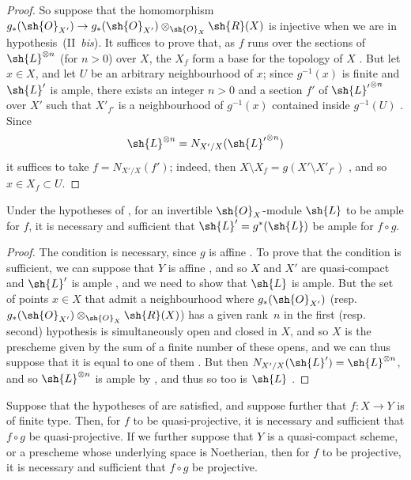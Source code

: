 \begin{proof}
So suppose that the homomorphism $g_*(\sh{O}_{X'})\to g_*(\sh{O}_{X'})\otimes_{\sh{O}_X}\sh{R}(X)$ is injective when we are in hypothesis~(II~\emph{bis}).
It suffices to prove that, as $f$ runs over the sections of $\sh{L}^{\otimes n}$ (for $n>0$) over $X$, the $X_f$ form a base for the topology of $X$ .
But let $x\in X$, and let $U$ be an arbitrary neighbourhood of $x$;
since $g^{-1}(x)$ is finite  and $\sh{L}'$ is ample, there exists an integer $n>0$ and a section $f'$ of ${\sh{L}'}^{\otimes n}$ over $X'$ such that $X'_{f'}$ is a neighbourhood of $g^{-1}(x)$ contained inside $g^{-1}(U)$ .
Since
\[
  \sh{L}^{\otimes n} = N_{X'/X}({\sh{L}'}^{\otimes n})
\]
it suffices to take $f=N_{X'/X}(f')$;
indeed, then $X\setminus X_f=g(X'\setminus X'_{f'})$ , and so $x\in X_f\subset U$.
\end{proof}

\begin{corollary}[6.6.3]
\label{II.6.6.3}
Under the hypotheses of , for an invertible $\sh{O}_X$-module $\sh{L}$ to be ample for $f$, it is necessary and sufficient that $\sh{L}'=g^*(\sh{L})$ be ample for $f\circ g$.
\end{corollary}

\begin{proof}
The condition is necessary, since $g$ is affine .
To prove that the condition is sufficient, we can suppose that $Y$ is affine , and so $X$ and $X'$ are quasi-compact and $\sh{L}'$ is ample , and we need to show that $\sh{L}$ is ample.
But the set of points $x\in X$ that admit a neighbourhood where $g_*(\sh{O}_{X'})$ (resp. $g_*(\sh{O}_{X'})\otimes_{\sh{O}_X}\sh{R}(X)$) has a given rank~$n$ in the first (resp. second) hypothesis is simultaneously open and closed in $X$, and so $X$ is the prescheme given by the sum of a finite number of these opens, and we can thus suppose that it is equal to one of them .
But then $N_{X'/X}(\sh{L}')=\sh{L}^{\otimes n}$, and so $\sh{L}^{\otimes n}$ is ample by , and thus so too is $\sh{L}$ .
\end{proof}

\begin{corollary}[6.6.4]
\label{II.6.6.4}
Suppose that the hypotheses of  are satisfied, and suppose further that $f:X\to Y$ is of finite type.
Then, for $f$ to be quasi-projective, it is necessary and sufficient that $f\circ g$ be quasi-projective.
If we further suppose that $Y$ is a quasi-compact scheme, or a prescheme whose underlying space is Noetherian, then for $f$ to be projective, it is necessary and sufficient that $f\circ g$ be projective.
\end{corollary}

